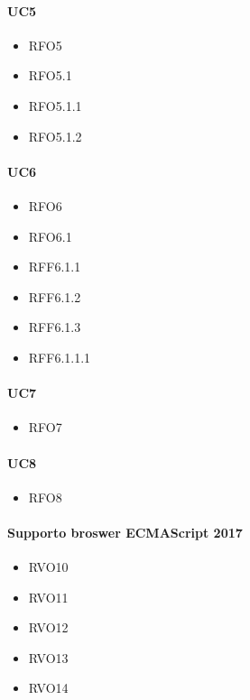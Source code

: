 \paragraph{UC5}
\quad
\begin{multicols}{3}
    \begin{itemize}
        \item RFO5
        \item RFO5.1
        \item RFO5.1.1
        \item RFO5.1.2
    \end{itemize}
\end{multicols}

\paragraph{UC6}
\quad
\begin{multicols}{3}
    \begin{itemize}
        \item RFO6
        \item RFO6.1
        \item RFF6.1.1
        \item RFF6.1.2
        \item RFF6.1.3
        \item RFF6.1.1.1
    \end{itemize}
\end{multicols}

\paragraph{UC7}
\quad
\begin{multicols}{3}
    \begin{itemize}
        \item RFO7
    \end{itemize}
\end{multicols}

\paragraph{UC8}
\quad
\begin{multicols}{3}
    \begin{itemize}
        \item RFO8
    \end{itemize}
\end{multicols}

\paragraph{Supporto broswer ECMAScript 2017}
\quad
\begin{multicols}{3}
    \begin{itemize}
        \item RVO10
        \item RVO11
        \item RVO12
        \item RVO13
        \item RVO14
    \end{itemize}
\end{multicols}
